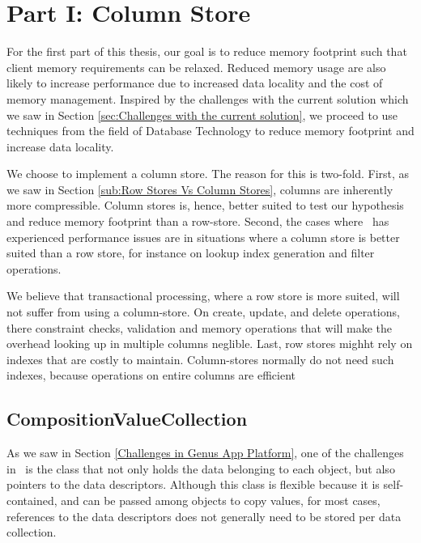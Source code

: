 \chapter{Part I: Column Store}
\label{chap:column-store}
For the first part of this thesis, our goal is to reduce memory footprint such that client memory requirements can be relaxed. Reduced memory usage are also likely to increase performance due to increased data locality and the cost of memory management. Inspired by the challenges with the current solution which we saw in Section \ref{sec:Challenges with the current solution}, we proceed to use techniques from the field of Database Technology to reduce memory footprint and increase data locality.

We choose to implement a column store. The reason for this is two-fold. First, as we saw in Section \ref{sub:Row Stores Vs Column Stores}, columns are inherently more compressible. Column stores is, hence, better suited to test our hypothesis and reduce memory footprint than a row-store. Second, the cases where \genus~has experienced performance issues are in situations where a column store is better suited than a row store, for instance on lookup index generation and filter operations.

We believe that transactional processing, where a row store is more suited, will not suffer from using a column-store. On create, update, and delete operations, there constraint checks, validation and memory operations that will make the overhead looking up in multiple columns neglible. Last, row stores mighht rely on indexes that are costly to maintain. Column-stores normally do not need such indexes, because operations on entire columns are efficient \cite{Plattner2014-fr}

\clearpage

\section{CompositionValueCollection}
\label{sec:CompositionValueCollection}
As we saw in Section \ref{Challenges in Genus App Platform}, one of the challenges in \gap~is the  class that not only holds the data belonging to each object, but also pointers to the data descriptors. Although this class is flexible because it is self-contained, and can be passed among objects to copy values, for most cases, references to the data descriptors does not generally need to be stored per data collection. 

